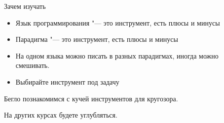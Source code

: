 \begin{frame}[t,fragile]{Зачем изучать}
	\begin{itemize}
	\item Язык программирования "--- это инструмент, есть плюсы и минусы
	\item Парадигма "--- это инструмент, есть плюсы и минусы
	\item	На одном языка можно писать в разных парадигмах, иногда можно смешивать.
	\item Выбирайте инструмент под задачу
	\end{itemize}
	Бегло познакомимся с кучей инструментов для кругозора.

	На других курсах будете углубляться.
\end{frame}
